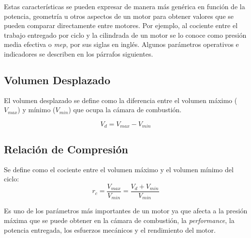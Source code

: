 Estas características se pueden expresar de manera más genérica en función de la
potencia, geometría u otros aspectos de un motor para obtener valores que se
pueden comparar directamente entre motores.
%
Por ejemplo, al cociente entre el trabajo entregado por ciclo y la cilindrada
de un motor se lo conoce como presión media efectiva o \emph{mep}, por sus
siglas en inglés.
%
Algunos parámetros operativos e indicadores se describen en los párrafos
siguientes.


\subsection{Volumen Desplazado}
%
El volumen desplazado se define como la diferencia entre el volumen máximo
($V_{max}$) y mínimo ($V_{min}$) que ocupa la cámara de combustión.

\begin{equation}\label{eq:vol_desp} V_d = V_{max}-V_{min}
\end{equation}
%



\subsection{Relación de Compresión}

Se define como el cociente entre el volumen máximo y el volumen mínimo del ciclo:
%
\begin{equation}\label{eq:rel_comp}
  r_c = \frac{V_{max}}{V_{min}} = \frac{V_d+V_{min}}{V_{min}}
\end{equation}

%
Es uno de los parámetros más importantes de un motor ya que afecta a la presión
máxima que se puede obtener en la cámara de combustión, la \emph{performance},
la potencia entregada, los esfuerzos mecánicos y el rendimiento del motor.

